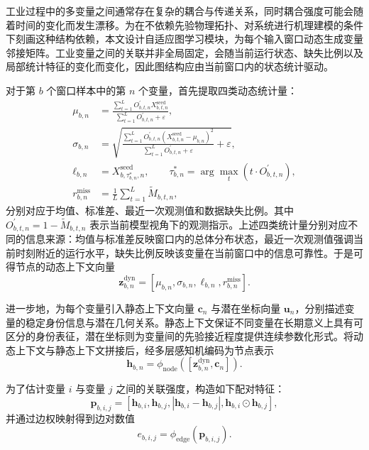 \documentclass[bachelor, vlined]{DissertUESTC}
\begin{document}
    工业过程中的多变量之间通常存在复杂的耦合与传递关系，同时耦合强度可能会随着时间的变化而发生漂移。为在不依赖先验物理拓扑、对系统进行机理建模的条件下刻画这种结构依赖，本文设计自适应图学习模块，为每个输入窗口动态生成变量邻接矩阵。工业变量之间的关联并非全局固定，会随当前运行状态、缺失比例以及局部统计特征的变化而变化，因此图结构应由当前窗口内的状态统计驱动。
    
    对于第 $b$ 个窗口样本中的第 $n$ 个变量，首先提取四类动态统计量：
    \begin{align}
        \mu_{b,n} &= \frac{\sum_{t=1}^{L} O_{b,t,n}^{\prime} X_{b,t,n}^{\mathrm{seed}}}{\sum_{t=1}^{L} O_{b,t,n}^{\prime} + \varepsilon}, \\
        \sigma_{b,n} &= \sqrt{\frac{\sum_{t=1}^{L} O_{b,t,n}^{\prime} \left(X_{b,t,n}^{\mathrm{seed}}-\mu_{b,n}\right)^2}{\sum_{t=1}^{L} O_{b,t,n}^{\prime} + \varepsilon} + \varepsilon}, \\
        \ell_{b,n} &= X_{b,\tau_{b,n}^{\ast},n}^{\mathrm{seed}}, \qquad \tau_{b,n}^{\ast} = \arg\max_t \left(t \cdot O_{b,t,n}^{\prime}\right), \\
        r_{b,n}^{\mathrm{miss}} &= \frac{1}{L}\sum_{t=1}^{L} \widetilde{M}_{b,t,n},
    \end{align}
    分别对应于均值、标准差、最近一次观测值和数据缺失比例。其中 $O_{b,t,n}^{\prime}=1-\widetilde{M}_{b,t,n}$ 表示当前模型视角下的观测指示。上述四类统计量分别对应不同的信息来源：均值与标准差反映窗口内的总体分布状态，最近一次观测值强调当前时刻附近的运行水平，缺失比例反映该变量在当前窗口中的信息可靠性。于是可得节点的动态上下文向量
    \begin{equation}
        \mathbf{z}_{b,n}^{\mathrm{dyn}} =
        [\mu_{b,n},\sigma_{b,n},\ell_{b,n},r_{b,n}^{\mathrm{miss}}].
    \end{equation}
    
    进一步地，为每个变量引入静态上下文向量 $\mathbf{c}_n$ 与潜在坐标向量 $\mathbf{u}_n$，分别描述变量的稳定身份信息与潜在几何关系。静态上下文保证不同变量在长期意义上具有可区分的身份表征，潜在坐标则为变量间的先验接近程度提供连续参数化形式。将动态上下文与静态上下文拼接后，经多层感知机编码为节点表示
    \begin{equation}
        \mathbf{h}_{b,n} = \phi_{\mathrm{node}}\!\left([\mathbf{z}_{b,n}^{\mathrm{dyn}},\mathbf{c}_n]\right).
    \end{equation}
    
    为了估计变量 $i$ 与变量 $j$ 之间的关联强度，构造如下配对特征：
    \begin{equation}
        \mathbf{p}_{b,i,j} =
        [\mathbf{h}_{b,i},\mathbf{h}_{b,j},|\mathbf{h}_{b,i}-\mathbf{h}_{b,j}|,\mathbf{h}_{b,i}\odot\mathbf{h}_{b,j}],
    \end{equation}
    并通过边权映射得到边对数值
    \begin{equation}
        e_{b,i,j} = \phi_{\mathrm{edge}}(\mathbf{p}_{b,i,j}).
    \end{equation}
    
\end{document}
